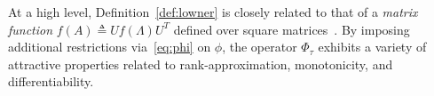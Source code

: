 \documentclass[10pt]{article}
\numberwithin{equation}{section}
\newcommand{\+}{%
	\raisebox{0.18ex}{\scaleobj{0.55}{+}}
}
\theoremstyle{definition}
\theoremstyle{definition}
\newcommand\numberthis{\addtocounter{equation}{1}\tag{\theequation}}
\begin{document}
\noindent 
At a high level, Definition~\eqref{def:lowner} is closely related to that of a \emph{matrix function} $f(A) \triangleq U f(\Lambda) U^T$ defined over square matrices~\cite{bhatia2013matrix}. 
By imposing additional restrictions via~\eqref{eq:phi} on $\phi$, the operator $\Phi_\tau$ exhibits a variety of attractive properties related to rank-approximation, monotonicity, and differentiability.
\noindent
\end{document}

